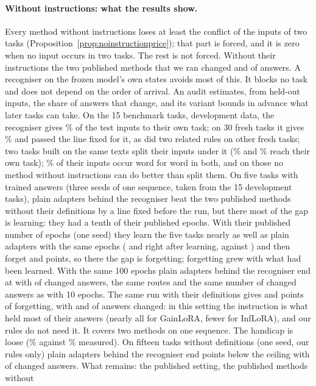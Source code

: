 \paragraph{Without instructions: what the results show.} Every method without instructions loses at least the conflict of the inputs of two tasks (Proposition~\ref{prop:noinstructionprice}); that part is forced, and it is zero when no input occurs in two tasks. The rest is not forced. Without their instructions the two published methods that we ran changed \AudSeedsGainloraChanged{} and \AudSeedsInfloraChanged{} of \AudSeedsCompared{} answers. A recogniser on the frozen model's own states avoids most of this. It blocks no task and does not depend on the order of arrival. An audit estimates, from held-out inputs, the share of answers that change, and its variant \handicap{} bounds in advance what later tasks can take. On the 15 benchmark tasks, development data, the recogniser gives \AudDevLLamOneEnd{}\% of the test inputs to their own task; on 30 fresh tasks it gives \AudFreshFourthLEnd{}\% and passed the line fixed for it, as did two related rules on other fresh tasks; two tasks built on the same texts split their inputs under it (\AudScalePairOlderLEnd{}\% and \AudScalePairNewerLEnd{}\% reach their own task); \AudConfPairShare{}\% of their inputs occur word for word in both, and on those no method without instructions can do better than split them. On five tasks with trained answers (three seeds of one sequence, taken from the 15 development tasks), plain adapters behind the recogniser beat the two published methods without their definitions by a line fixed before the run, but there most of the gap is learning: they had a tenth of their published epochs. With their published number of epochs (one seed) they learn the five tasks nearly as well as plain adapters with the same epochs (\AudFullInfloraLearned{} and \AudFullGainloraLearned{} right after learning, against \AudFullOursRidgeLearned{}) and then forget \AudFullInfloraFT{} and \AudFullGainloraFT{} points, so there the gap is forgetting; forgetting grew with what had been learned. With the same 100 epochs plain adapters behind the recogniser end at \AudFullOursRidgeAP{} with \AudFullOursRidgeChanged{} of \AudFullCompared{} changed answers, the same routes and the same number of changed answers as with 10 epochs. The same run with their definitions gives \AudFullDefOriginalInfloraFT{} and \AudFullDefOriginalGainloraFT{} points of forgetting, with \AudFullDefOriginalInfloraChanged{} and \AudFullDefOriginalGainloraChanged{} of \AudFullDefCompared{} answers changed: in this setting the instruction is what held most of their answers (nearly all for GainLoRA, fewer for InfLoRA), and our rules do not need it. It covers two methods on one sequence. The handicap is loose (\AudDevHPrimeTTwoBound{}\% against \AudDevHPrimeTTwoChanged{}\% measured). On fifteen tasks without definitions (one seed, our rules only) plain adapters behind the recogniser end \AudFifteenNoDefRidgeBelowOwn{} points below the ceiling with \AudFifteenNoDefRidgeChanged{} of \AudFifteenNoDefCompared{} changed answers. What remains: the published setting, the published methods without 